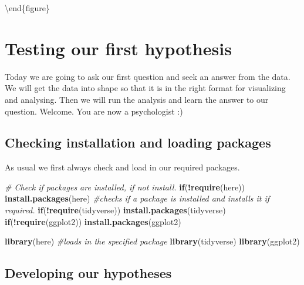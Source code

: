 \documentclass[
]{book}
\newenvironment{Shaded}{\begin{snugshade}}{\end{snugshade}}
\newcommand{\CommentTok}[1]{\textcolor[rgb]{0.56,0.35,0.01}{\textit{#1}}}
\newcommand{\ControlFlowTok}[1]{\textcolor[rgb]{0.13,0.29,0.53}{\textbf{#1}}}
\newcommand{\FunctionTok}[1]{\textcolor[rgb]{0.13,0.29,0.53}{\textbf{#1}}}
\newcommand{\NormalTok}[1]{#1}
\newcommand{\SpecialCharTok}[1]{\textcolor[rgb]{0.81,0.36,0.00}{\textbf{#1}}}
\newcommand{\StringTok}[1]{\textcolor[rgb]{0.31,0.60,0.02}{#1}}
\begin{document}
\label{fig:unnamed-chunk-43}
\textbackslash end\{figure\}

\chapter{Testing our first hypothesis}\label{testing-our-first-hypothesis}

Today we are going to ask our first question and seek an answer from the data. We will get the data into shape so that it is in the right format for visualizing and analysing. Then we will run the analysis and learn the answer to our question. Welcome. You are now a psychologist :)

\section{Checking installation and loading packages}\label{checking-installation-and-loading-packages-2}

As usual we first always check and load in our required packages.

\begin{Shaded}
\begin{Highlighting}[]
\CommentTok{\# Check if packages are installed, if not install.}
\ControlFlowTok{if}\NormalTok{(}\SpecialCharTok{!}\FunctionTok{require}\NormalTok{(here)) }\FunctionTok{install.packages}\NormalTok{(}\StringTok{\textquotesingle{}here\textquotesingle{}}\NormalTok{) }\CommentTok{\#checks if a package is installed and installs it if required.}
\ControlFlowTok{if}\NormalTok{(}\SpecialCharTok{!}\FunctionTok{require}\NormalTok{(tidyverse)) }\FunctionTok{install.packages}\NormalTok{(}\StringTok{\textquotesingle{}tidyverse\textquotesingle{}}\NormalTok{)}
\ControlFlowTok{if}\NormalTok{(}\SpecialCharTok{!}\FunctionTok{require}\NormalTok{(ggplot2)) }\FunctionTok{install.packages}\NormalTok{(}\StringTok{\textquotesingle{}ggplot2\textquotesingle{}}\NormalTok{)}

\FunctionTok{library}\NormalTok{(here) }\CommentTok{\#loads in the specified package}
\FunctionTok{library}\NormalTok{(tidyverse)}
\FunctionTok{library}\NormalTok{(ggplot2)}
\end{Highlighting}
\end{Shaded}

\section{Developing our hypotheses}\label{developing-our-hypotheses}
\end{document}
